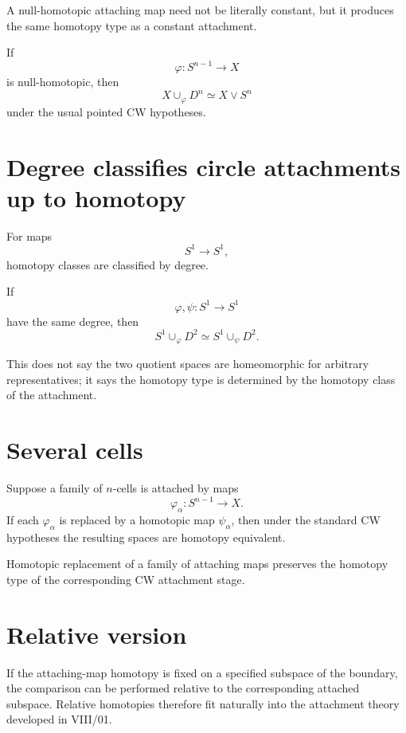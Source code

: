 A null-homotopic attaching map need not be literally constant, but it produces
the same homotopy type as a constant attachment.

\begin{corollary}
\label{cor:viii08-null-attachment}
If
\[
\varphi:S^{n-1}\to X
\]
is null-homotopic, then
\[
X\cup_\varphi D^n
\simeq
X\vee S^n
\]
under the usual pointed CW hypotheses.
\end{corollary}

\section{Degree classifies circle attachments up to homotopy}

For maps
\[
S^1\to S^1,
\]
homotopy classes are classified by degree.

\begin{corollary}
\label{cor:viii08-degree}
If
\[
\varphi,\psi:S^1\to S^1
\]
have the same degree, then
\[
S^1\cup_\varphi D^2
\simeq
S^1\cup_\psi D^2.
\]
\end{corollary}

This does not say the two quotient spaces are homeomorphic for arbitrary
representatives; it says the homotopy type is determined by the homotopy class
of the attachment.

\section{Several cells}

Suppose a family of \(n\)-cells is attached by maps
\[
\varphi_\alpha:S^{n-1}\to X.
\]
If each \(\varphi_\alpha\) is replaced by a homotopic map
\(\psi_\alpha\), then under the standard CW hypotheses the resulting spaces are
homotopy equivalent.

\begin{theorem}
\label{thm:viii08-simultaneous}
Homotopic replacement of a family of attaching maps preserves the homotopy type
of the corresponding CW attachment stage.
\end{theorem}

\section{Relative version}

If the attaching-map homotopy is fixed on a specified subspace of the boundary,
the comparison can be performed relative to the corresponding attached
subspace.  Relative homotopies therefore fit naturally into the attachment
theory developed in VIII/01.

